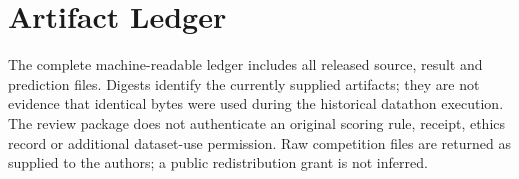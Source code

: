 \documentclass[doublecolumn]{ijcvsplatex}
\begin{document}
\section{Artifact Ledger}

The complete machine-readable ledger includes all released source, result and prediction files. Digests identify the currently supplied artifacts; they are not evidence that identical bytes were used during the historical datathon execution. The review package does not authenticate an original scoring rule, receipt, ethics record or additional dataset-use permission. Raw competition files are returned as supplied to the authors; a public redistribution grant is not inferred.
\end{document}

